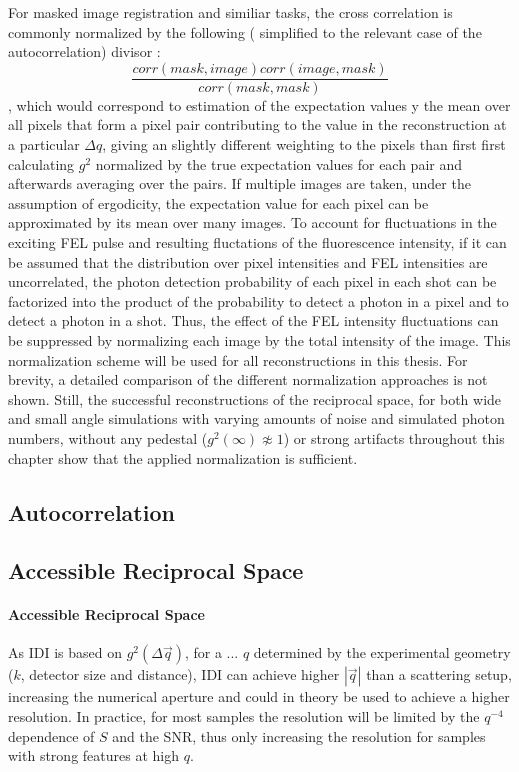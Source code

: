 For masked image registration and similiar tasks, the cross correlation is commonly normalized by the following ( simplified to the relevant case of the autocorrelation) divisor \cite{padfield2010}:
\begin{equation}
\frac{\mathit{corr}(\mathit{mask},\mathit{image}) \mathit{corr}(\mathit{image},\mathit{mask})}{\mathit{corr}(\mathit{mask},\mathit{mask})}
\end{equation}, which would correspond to estimation of the expectation values  y the mean over all pixels that form a pixel pair contributing to the value in the reconstruction at a particular $\Delta q$, giving an slightly different weighting to the pixels than first first calculating $g^2$ normalized by the true expectation values for each pair and afterwards averaging over the pairs.
If multiple images are taken, under the assumption of ergodicity, the expectation value for each pixel can be approximated by its mean over many images. To account for fluctuations in the exciting FEL pulse and resulting fluctations of the fluorescence intensity, if it can be assumed that the distribution over pixel intensities and FEL intensities are uncorrelated, the photon detection probability of each pixel in each shot can be factorized into the product of the probability to detect a photon in a pixel and to detect a photon in a shot. Thus, the effect of the FEL intensity fluctuations can be suppressed by normalizing each image by the total intensity of the image. This normalization scheme will be used for all reconstructions in this thesis.
For brevity, a detailed comparison of the different normalization approaches is not shown. Still, the successful reconstructions of the reciprocal space, for both wide and small angle simulations with varying amounts of noise and simulated photon numbers, without any pedestal ($g^2(\infty)\not\approx 1$) or strong artifacts throughout this chapter show that the applied normalization is sufficient.  

\subsection{Autocorrelation}

\subsection{Accessible Reciprocal Space}
	\paragraph{Accessible Reciprocal Space}
	As IDI is based on $g^2(\Delta \vec{q})$, for a ...  $q$ determined by the experimental geometry ($k$, detector size and distance), IDI can achieve higher $\left|\vec{q}\right|$ than a scattering setup, increasing the numerical aperture and could in theory be used to achieve a higher resolution. In practice, for most samples the resolution will be limited by the $q^{-4}$ dependence of $S$ and the SNR, thus only increasing the resolution for samples with strong features at high $q$.
	
